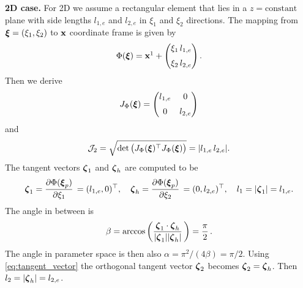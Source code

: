 \textbf{2D case.}
For 2D we assume a rectangular element that lies in a $z=\text{constant}$ plane with side lengths $l_{1,e}$ and $l_{2,e}$ in $\xi_1$ and $\xi_2$ directions.
The mapping from $\boldsymbol{\xi}=(\xi_1,\xi_2)$ to $\textbf{x}$ coordinate frame is given by
\begin{equation}
  \begin{array}{ll}
    \Phi(\boldsymbol{\xi}) = \textbf{x}^1 + \left(\begin{matrix}\xi_1\,l_{1,e} \\[2mm] \xi_2\,l_{2,e}\end{matrix}\right).
  \end{array}
\end{equation}
Then we derive
\begin{equation*}
  \begin{array}{lll}
    J_{\Phi}(\boldsymbol{\xi}) = \left(\begin{matrix}l_{1,e}  & 0 \\[2mm] 0 & l_{2,e}\end{matrix}\right)
  \end{array}
\end{equation*}
and
\begin{equation*}
  \begin{array}{lll}
    \mathcal{J}_2 = \sqrt{\hbox{det} \, \big(J_{\Phi}(\boldsymbol{\xi})^\top J_{\Phi}(\boldsymbol{\xi})\big)} = |l_{1,e}\,l_{2,e}|.
  \end{array}
\end{equation*}
The tangent vectors $\boldsymbol{\zeta}_1$ and $\boldsymbol{\zeta}_h$ are computed to be
\begin{equation*}
  \begin{array}{lll}
    \bfzeta_1 = \p{\Phi(\bfxi_p)}{\xi_1} = (l_{1,e},0)^\top,\quad
    \bfzeta_h = \p{\Phi(\bfxi_p)}{\xi_2} = (0, l_{2,e})^\top,
     \quad l_1 = |\bfzeta_1| = l_{1,e}.
  \end{array}
\end{equation*}
The angle in between is
\begin{equation*}
  \begin{array}{lll}
    \beta = \arccos\left(\displaystyle\frac{\displaystyle{\boldsymbol{\zeta}_1\cdot \boldsymbol{\zeta}_h}}{\displaystyle{|\boldsymbol{\zeta}_1||\boldsymbol{\zeta}_h|}}\,\right) = \displaystyle\frac{\displaystyle{\pi}}{\displaystyle{2}}\,.
  \end{array}
\end{equation*}
The angle in parameter space is then also $\alpha = \pi^2 / (4\beta) = \pi/2$.
Using \eqref{eq:tangent_vector} the orthogonal tangent vector $\boldsymbol{\zeta}_2$ becomes $\boldsymbol{\zeta}_2 = \boldsymbol{\zeta}_h$. Then $l_2 = |\boldsymbol{\zeta}_h| = l_{2,e}$.

